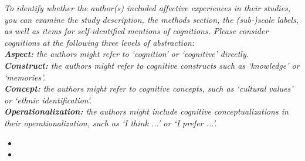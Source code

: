 \documentclass[10pt,a4paper]{protocol}
\begin{document}
\textit{To identify whether the author(s) included affective experiences in their studies, you can examine the study description, the methods section, the (sub-)scale labels, as well as items for self-identified mentions of cognitions. Please consider cognitions at the following three levels of abstraction:\\
\textbf{Aspect:} the authors might refer to `cognition' or `cognitive' directly.\\
\textbf{Construct:} the authors might refer to cognitive constructs such as `knowledge' or `memories'.\\
\textbf{Concept:} the authors might refer to cognitive concepts, such as `cultural values' or `ethnic identification'.\\
\textbf{Operationalization:} the authors might include cognitive conceptualizations in their operationalization, such as `I think ...' or `I prefer ...'.}
\vspace{0.5em}
\begin{itemize}
	\item {}
	\item {}
\end{itemize}
\divider

\end{document}
